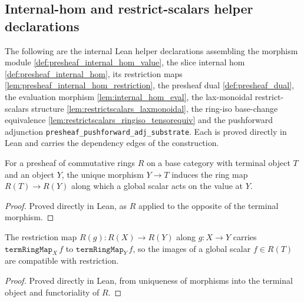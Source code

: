 \subsection{Internal-hom and restrict-scalars helper declarations}
\label{subsec:tensorobj_internalhom_helpers}

The following are the internal Lean helper declarations assembling the morphism
module \cref{def:presheaf_internal_hom_value}, the slice internal hom
\cref{def:presheaf_internal_hom}, its restriction maps
\cref{lem:presheaf_internal_hom_restriction}, the presheaf dual
\cref{def:presheaf_dual}, the evaluation morphism \cref{lem:internal_hom_eval}, the
lax-monoidal restrict-scalars structure \cref{lem:restrictscalars_laxmonoidal}, the
ring-iso base-change equivalence \cref{lem:restrictscalars_ringiso_tensorequiv} and
the pushforward adjunction \texttt{presheaf\_pushforward\_adj\_substrate}. Each is
proved directly in Lean and carries the dependency edges of the construction.

\begin{definition}\leanok
  \label{def:term_ring_map}
  For a presheaf of commutative rings \(R\) on a base category with terminal object
  \(T\) and an object \(Y\), the unique morphism \(Y \to T\) induces the ring map
  \(R(T) \to R(Y)\) along which a global scalar acts on the value at \(Y\).
\end{definition}
\begin{proof}
  \leanok
  Proved directly in Lean, as \(R\) applied to the opposite of the terminal morphism.
\end{proof}

\begin{lemma}\leanok
  \label{lem:term_ring_map_naturality}
  The restriction map \(R(g) : R(X) \to R(Y)\) along \(g : X \to Y\) carries
  \(\mathtt{termRingMap}_X\,f\) to \(\mathtt{termRingMap}_Y\,f\), so the images of a
  global scalar \(f \in R(T)\) are compatible with restriction.
\end{lemma}
\begin{proof}
  \leanok
  Proved directly in Lean, from uniqueness of morphisms into the terminal object and
  functoriality of \(R\).
\end{proof}

